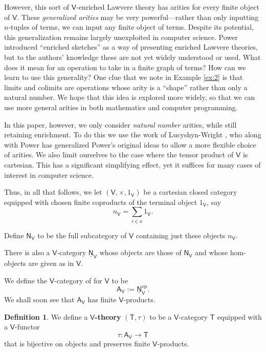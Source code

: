 \documentclass{amsart}
\newcommand{\define}[1]{{\bf \boldmath{#1}}}
\theoremstyle{definition}
\newtheorem{definition}[theorem]{Definition}
\newcommand{\NN}{\mathsf{N}}
\newcommand{\A}{\mathsf{A}}
\newcommand{\V}{\mathsf{V}}
\newcommand{\T}{\mathsf{T}}
\newcommand{\op}{\mathrm{op}}
\newcommand{\maps}{\colon}
\begin{document}
However, this sort of $\V$-enriched Lawvere theory has arities for every finite object of $\V$.  These \textit{generalized arities} may be very powerful---rather than only inputting $n$-tuples of terms, we can input any finite object of terms.  Despite its potential, this generalization remains largely unexploited in computer science.   Power \cite{powsketch} introduced ``enriched sketches'' as a way of presenting enriched Lawvere theories, but to the authors' knowledge these are not yet widely understood or used.  What does it mean for an operation to take in a finite graph of terms?  How can we learn to use this generality? One clue that we note in Example \ref{ex:2} is that limits and colimits are operations whose arity is a ``shape'' rather than only a natural number. We hope that this idea is explored more widely, so that we can use more general arities in both mathematics and computer programming.

In this paper, however, we only consider \textit{natural number} arities, while still retaining enrichment. To do this we use the work of Lucyshyn-Wright \cite{lucyshyn-wright}, who along with Power \cite{np} has generalized Power's original ideas to allow a more flexible choice of arities.    We also limit ourselves to the case where the tensor product of $\V$ is cartesian.  This has a significant simplifying effect, yet it suffices for many cases of interest in computer science.

Thus, in all that follows, we let $(\V,\times,1_\V)$ be a cartesian closed category equipped with chosen finite coproducts of the terminal object $1_\V$, say 
\[   n_\V = \sum_{i \in n} 1_\V . \]  
\iffalse
These objects come with natural isomorphisms
\[
\V(n_\V,a) \cong\V(1_\V,a)^n .
\]
\fi
Define $\NN_\V$ to be the full subcategory of $\V$ containing just these objects $n_\V$.  
\iffalse
Since $\NN_\V$ has finite coproducts, $\NN_\V^\op$ has finite products.  
Let
\[ j \maps \NN_\V \hookrightarrow \V \]
be the inclusion.    
\fi
There is also a $\V$-category $\underline{\NN}_\V$ whose objects are those of $\NN_\V$ and whose hom-objects are given as in $\V$.   
\iffalse
\[         \NN_\V(a,b) = j(b)^{j(a)}  \]
for all $a,b \in \NN_\V$. 
\fi
We define the $\V$-category of \define{arities} for $\V$ to be 
\[             \A_\V := \underline{\NN}_\V^\op   .\]
We shall soon see that $\A_\V$ has finite $\V$-products. 

\begin{definition}
\label{defn:V-theory}
We define a \textbf{$\V$-theory} $(\T,\tau)$ to be a $\V$-category $\T$ equipped with a $\V$-functor 
\[ \tau  \maps \A_\V \to \T \]
that is bijective on objects and preserves finite $\V$-products.
\end{definition}
\end{document}
